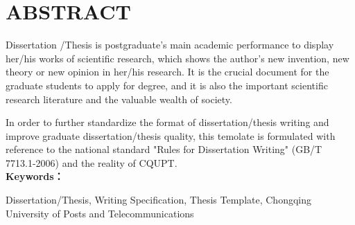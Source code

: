 



\chapter{ABSTRACT}

Dissertation /Thesis is postgraduate’s main academic performance to display her/his works of scientific research, which shows the author’s new invention, new theory or new opinion in her/his research. It is the crucial document for the graduate students to apply for degree, and it is also the important scientific research literature and the valuable wealth of society.

In order to further standardize the format of dissertation/thesis writing and improve graduate dissertation/thesis quality, this temolate is formulated with reference to the national standard "Rules for Dissertation Writing" (GB/T 7713.1-2006) and the reality of CQUPT.
\\

\noindent\textbf{Keywords：} 
\begin{minipage}[t]{0.85\linewidth}
	Dissertation/Thesis, Writing Specification, Thesis Template, Chongqing University of Posts and Telecommunications
\end{minipage}

\clearpage